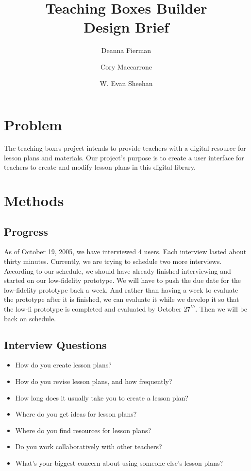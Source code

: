 \documentclass[12pt,titlepage]{article}
\title{Teaching Boxes Builder \\ Design Brief}
\author{Deanna Fierman \and Cory Maccarrone \and W. Evan Sheehan}
\begin{document}
\maketitle

\hfill
\thispagestyle{empty}
\pagebreak
\setcounter{page}{0}

\section{Problem}
The teaching boxes project intends to provide teachers with a digital resource
for lesson plans and materials. Our project's purpose is to create a user
interface for teachers to create and modify lesson plans in this digital
library.

\section{Methods}
\subsection{Progress}
As of October 19, 2005, we have interviewed 4 users. Each interview lasted about
thirty minutes.  Currently, we are trying to schedule two more interviews.
According to our schedule, we should have already finished interviewing and
started on our low-fidelity prototype. We will have to push the due date for the
low-fidelity prototype back a week. And rather than having a week to evaluate
the prototype after it is finished, we can evaluate it while we develop it so
that the low-fi prototype is completed and evaluated by October $27^{th}$. Then
we will be back on schedule.

\subsection{Interview Questions}
\begin{itemize}
	\item How do you create lesson plans?
	\item How do you revise lesson plans, and how frequently?
	\item How long does it usually take you to create a lesson plan?
	\item Where do you get ideas for lesson plans?
	\item Where do you find resources for lesson plans?
	\item Do you work collaboratively with other teachers?
	\item What's your biggest concern about using someone else's lesson plans?
\end{itemize}

\pagebreak
\hfill
\end{document}

